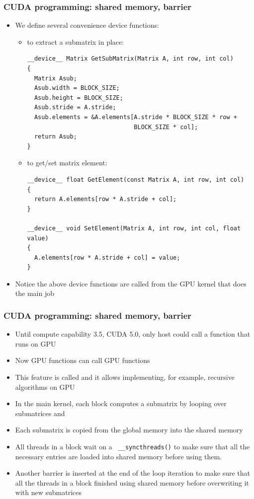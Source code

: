 \begin{frame}[fragile]
  \frametitle{CUDA programming: shared memory, barrier}
  \begin{itemize}
  \item We define several convenience device functions:
    \begin{itemize}
    \item to extract a submatrix in place:
      {\color{mycolorcode}
        {\tiny
\begin{verbatim}
__device__ Matrix GetSubMatrix(Matrix A, int row, int col)
{
  Matrix Asub;
  Asub.width = BLOCK_SIZE;
  Asub.height = BLOCK_SIZE;
  Asub.stride = A.stride;
  Asub.elements = &A.elements[A.stride * BLOCK_SIZE * row + 
                              BLOCK_SIZE * col];
  return Asub;
}
\end{verbatim}
      }
    }
    \item to get/set matrix element:
      {\color{mycolorcode}
        {\tiny
\begin{verbatim}
__device__ float GetElement(const Matrix A, int row, int col)
{
  return A.elements[row * A.stride + col];
}

__device__ void SetElement(Matrix A, int row, int col, float value)
{
  A.elements[row * A.stride + col] = value;
}
\end{verbatim}
      }
    }
    \end{itemize}
  \item Notice the above device functions are called from the GPU kernel that does the main job
  \end{itemize}
\end{frame}

\begin{frame}[fragile]
  \frametitle{CUDA programming: shared memory, barrier}
  \begin{itemize}
  \item Until compute capability 3.5, CUDA 5.0, only host could call a function that runs on GPU
  \item Now GPU functions can call GPU functions
  \item This feature is called  and it  allows implementing, for example, recursive algorithms on GPU
  \item In the main kernel, each block computes a submatrix  by looping over submatrices  and 
  \item Each submatrix is copied from the global memory into the shared memory
  \item All threads in a block wait on a  {\color{mycolorcode}\verb| __syncthreads()|} to make sure that all the necessary entries are loaded into shared memory
    before using them.
  \item Another barrier is inserted at the end of the loop iteration to make sure that all the threads in a block finished using shared memory before overwriting it with new submatrices
  \end{itemize}
\end{frame}


